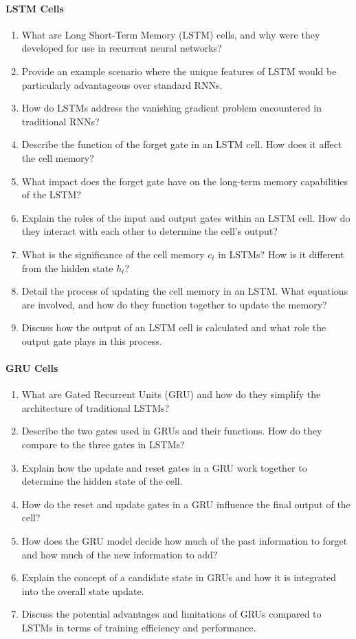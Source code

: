 \paragraph*{LSTM Cells}

\begin{enumerate}
	\item What are Long Short-Term Memory (LSTM) cells, and why were they developed for use in recurrent neural networks?
	\item Provide an example scenario where the unique features of LSTM would be particularly advantageous over standard RNNs.
	\item How do LSTMs address the vanishing gradient problem encountered in traditional RNNs?
	\item Describe the function of the forget gate in an LSTM cell. How does it affect the cell memory?
	\item What impact does the forget gate have on the long-term memory capabilities of the LSTM?
	\item Explain the roles of the input and output gates within an LSTM cell. How do they interact with each other to determine the cell's output?
	\item What is the significance of the cell memory $c_t$ in LSTMs? How is it different from the hidden state $h_t$?
	\item Detail the process of updating the cell memory in an LSTM. What equations are involved, and how do they function together to update the memory?
	\item Discuss how the output of an LSTM cell is calculated and what role the output gate plays in this process.
\end{enumerate}

\paragraph*{GRU Cells}

\begin{enumerate}
	\item What are Gated Recurrent Units (GRU) and how do they simplify the architecture of traditional LSTMs?
	\item Describe the two gates used in GRUs and their functions. How do they compare to the three gates in LSTMs?
	\item Explain how the update and reset gates in a GRU work together to determine the hidden state of the cell.
	\item How do the reset and update gates in a GRU influence the final output of the cell?
	\item How does the GRU model decide how much of the past information to forget and how much of the new information to add?
	\item Explain the concept of a candidate state in GRUs and how it is integrated into the overall state update.
	\item Discuss the potential advantages and limitations of GRUs compared to LSTMs in terms of training efficiency and performance.
\end{enumerate}

